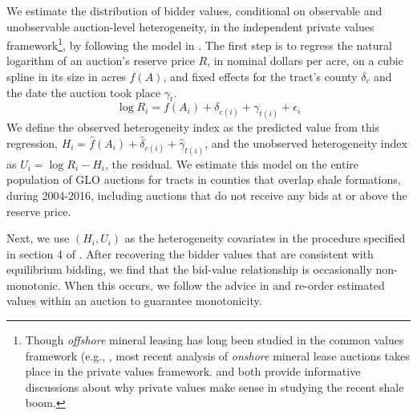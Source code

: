 \documentclass[12pt]{article}
\begin{document}
\begin{appendices}
We estimate the distribution of bidder values, conditional on observable and unobservable auction-level heterogeneity, in the independent private values framework\footnote{Though \textit{offshore} mineral leasing has long been studied in the common values framework (e.g., \cite{hendricks_empirical_1988}, most recent analysis of \textit{onshore} mineral lease auctions takes place in the private values framework.  \cite{kong2016sequential} and \cite{kong_selective_2017} both provide informative discussions about why private values make sense in studying the recent shale boom.}, by following the model in \cite{roberts2013unobserved}.  The first step is to regress the natural logarithm of an auction's reserve price $R$, in nominal dollars per acre, on a cubic spline in its size in acres $f(A)$, and fixed effects for the tract's county $\delta_{c}$ and the date the auction took place $\gamma_{t}$.
\begin{equation*}
	\log R_i = f(A_i) + \delta_{c(i)} + \gamma_{t(i)} + \epsilon_i
\end{equation*}
We define the observed heterogeneity index as the predicted value from this regression, $H_i = \widehat{f}(A_i) + \widehat{\delta}_{c(i)} + \widehat{\gamma}_{t(i)}$, and the unobserved heterogeneity index as $U_i = \log R_i - H_i$, the residual.  We estimate this model on the entire population of GLO auctions for tracts in counties that overlap shale formations, during 2004-2016, including auctions that do not receive any bids at or above the reserve price.

Next, we use $(H_i,U_i)$ as the heterogeneity covariates in the procedure specified in section 4 of \cite{guerre2000optimal}.  After recovering the bidder values that are consistent with equilibrium bidding, we find that the bid-value relationship is occasionally non-monotonic.  When this occurs, we follow the advice in \cite{chernozhukov2009improving} and re-order estimated values within an auction to guarantee monotonicity.


\end{appendices}
\end{document}
